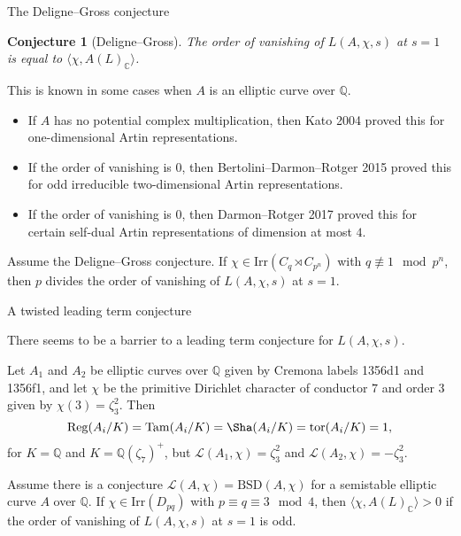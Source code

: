 \documentclass[10pt]{beamer}
\newtheorem{conjecture}{Conjecture}
\begin{document}
\begin{frame}[t]{The Deligne--Gross conjecture}

\begin{conjecture}[Deligne--Gross]
The order of vanishing of $ L(A, \chi, s) $ at $ s = 1 $ is equal to $ \langle\chi, A(L)_\mathbb{C}\rangle $.
\end{conjecture}

\pause

This is known in some cases when $ A $ is an elliptic curve over $ \mathbb{Q} $.

\begin{itemize}
\item If $ A $ has no potential complex multiplication, then Kato 2004 proved this for one-dimensional Artin representations.
\item If the order of vanishing is $ 0 $, then Bertolini--Darmon--Rotger 2015 proved this for odd irreducible two-dimensional Artin representations.
\item If the order of vanishing is $ 0 $, then Darmon--Rotger 2017 proved this for certain self-dual Artin representations of dimension at most $ 4 $.
\end{itemize}

\pause

\begin{theorem}
Assume the Deligne--Gross conjecture. If $ \chi \in \mathrm{Irr}(C_q \rtimes C_{p^n}) $ with $ q \not\equiv 1 \mod p^n $, then $ p $ divides the order of vanishing of $ L(A, \chi, s) $ at $ s = 1 $.
\end{theorem}

\end{frame}

\begin{frame}[t]{A twisted leading term conjecture}

There seems to be a barrier to a leading term conjecture for $ L(A, \chi, s) $.

\pause

\begin{example}
Let $ A_1 $ and $ A_2 $ be elliptic curves over $ \mathbb{Q} $ given by Cremona labels 1356d1 and 1356f1, and let $ \chi $ be the primitive Dirichlet character of conductor $ 7 $ and order $ 3 $ given by $ \chi(3) = \zeta_3^2 $. \pause Then
$$ \mathrm{Reg}(A_i / K) = \mathrm{Tam}(A_i / K) = \Sha(A_i / K) = \mathrm{tor}(A_i / K) = 1, $$
for $ K = \mathbb{Q} $ and $ K = \mathbb{Q}(\zeta_7)^+ $, but $ \mathcal{L}(A_1, \chi) = \zeta_3^2 $ and $ \mathcal{L}(A_2, \chi) = -\zeta_3^2 $.
\end{example}

\pause

\begin{theorem}
Assume there is a conjecture $ \mathcal{L}(A, \chi) = \mathrm{BSD}(A, \chi) $ for a semistable elliptic curve $ A $ over $ \mathbb{Q} $. If $ \chi \in \mathrm{Irr}(D_{pq}) $ with $ p \equiv q \equiv 3 \mod 4 $, then $ \langle\chi, A(L)_\mathbb{C}\rangle > 0 $ if the order of vanishing of $ L(A, \chi, s) $ at $ s = 1 $ is odd.
\end{theorem}

\end{frame}
\end{document}
